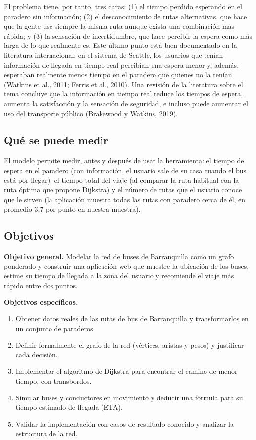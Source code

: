 \documentclass[12pt,letterpaper]{article}
\begin{document}
El problema tiene, por tanto, tres caras: (1) el tiempo perdido esperando en el paradero sin información; (2) el desconocimiento de rutas alternativas, que hace que la gente use siempre la misma ruta aunque exista una combinación más rápida; y (3) la sensación de incertidumbre, que hace percibir la espera como más larga de lo que realmente es. Este último punto está bien documentado en la literatura internacional: en el sistema de Seattle, los usuarios que tenían información de llegada en tiempo real percibían una espera menor y, además, esperaban realmente menos tiempo en el paradero que quienes no la tenían (Watkins et al., 2011; Ferris et al., 2010). Una revisión de la literatura sobre el tema concluye que la información en tiempo real reduce los tiempos de espera, aumenta la satisfacción y la sensación de seguridad, e incluso puede aumentar el uso del transporte público (Brakewood y Watkins, 2019).

\subsection{Qué se puede medir}
El modelo permite medir, antes y después de usar la herramienta: el tiempo de espera en el paradero (con información, el usuario sale de su casa cuando el bus está por llegar), el tiempo total del viaje (al comparar la ruta habitual con la ruta óptima que propone Dijkstra) y el número de rutas que el usuario conoce que le sirven (la aplicación muestra todas las rutas con paradero cerca de él, en promedio 3,7 por punto en nuestra muestra).

\subsection{Objetivos}
\textbf{Objetivo general.} Modelar la red de buses de Barranquilla como un grafo ponderado y construir una aplicación web que muestre la ubicación de los buses, estime su tiempo de llegada a la zona del usuario y recomiende el viaje más rápido entre dos puntos.

\noindent\textbf{Objetivos específicos.}
\begin{enumerate}
\item Obtener datos reales de las rutas de bus de Barranquilla y transformarlos en un conjunto de paraderos.
\item Definir formalmente el grafo de la red (vértices, aristas y pesos) y justificar cada decisión.
\item Implementar el algoritmo de Dijkstra para encontrar el camino de menor tiempo, con transbordos.
\item Simular buses y conductores en movimiento y deducir una fórmula para su tiempo estimado de llegada (ETA).
\item Validar la implementación con casos de resultado conocido y analizar la estructura de la red.
\end{enumerate}
\end{document}

